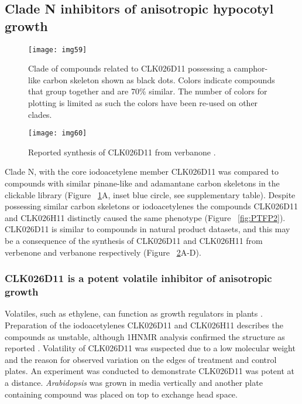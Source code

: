 \subsection{Clade N inhibitors of anisotropic hypocotyl growth}

\begin{figure}
\centering
\texttt{[image: img59]}
\caption{Clade of compounds related to CLK026D11 possessing a camphor-like carbon skeleton shown as black dots. Colors indicate compounds that group together and are 70{\%} similar. The number of colors for plotting is limited as such the colors have been re-used on other clades.}
\label{fig:CamphorLikeClade}
\end{figure}

\begin{figure}
\centering
\texttt{[image: img60]}
\caption{Reported synthesis of CLK026D11 from verbanone  \cite{dikusar2001synthesis}.}
\label{fig:CLK026D11Retrosynthesis}
\end{figure}

Clade N, with the core iodoacetylene member CLK026D11 was compared to compounds with similar pinane-like and adamantane carbon skeletons in the clickable library (Figure ~\ref{fig:CamphorLikeClade}A, inset blue circle, see supplementary table). Despite possessing similar carbon skeletons or iodoacetylenes the compounds CLK026D11 and CLK026H11 distinctly caused the same phenotype (Figure ~\ref{fig:PTFP2}). CLK026D11 is similar to compounds in natural product datasets, and this may be a consequence of the synthesis of CLK026D11 and CLK026H11 from verbenone and verbanone respectively (Figure ~\ref{fig:CLK026D11Retrosynthesis}A-D)\cite{dikusar2001synthesis}.

\subsubsection{CLK026D11 is a potent volatile inhibitor of anisotropic growth}

Volatiles, such as ethylene, can function as growth regulators in plants \cite{lehman1996hookless1}. Preparation of the iodoacetylenes CLK026D11 and CLK026H11 describes the compounds as unstable, although 1HNMR analysis confirmed the structure as reported \cite{dikusar2001synthesis}. Volatility of CLK026D11 was suspected due to a low molecular weight and the reason for observed variation on the edges of treatment and control plates. An experiment was conducted to demonstrate CLK026D11 was potent at a distance. {\it Arabidopsis} was grown in media vertically and another plate containing compound was placed on top to exchange head space.

